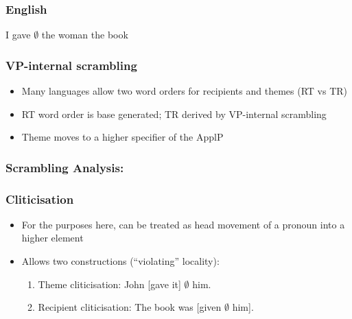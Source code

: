 \documentclass{beamer}
\begin{document}
\begin{frame}
	\frametitle{English}
	\vfill
	I gave $\emptyset$ the woman the book
	\vfill
\end{frame}

\begin{frame}
	\frametitle{VP-internal scrambling}
	\begin{itemize}
		\item Many languages allow two word orders for recipients and themes (RT vs TR)
		\item RT word order is base generated; TR derived by VP-internal scrambling \citep{Takano.1998,Lenerz.1977}
		\item Theme moves to a higher specifier of the ApplP \citep{McGinnis.1998}
	\end{itemize}
\end{frame}

\begin{frame}
	\frametitle{Scrambling Analysis:}
	\begin{exe}
		\ex
{}
	\end{exe}
\end{frame}

\begin{frame}
	\frametitle{Cliticisation}
	\begin{itemize}
		\item For the purposes here, can be treated as head movement of a pronoun into a higher element
		\item Allows two constructions (``violating'' locality):
		\begin{enumerate}
			\item Theme cliticisation: John [gave it] $\emptyset$ him.
			\item Recipient cliticisation: The book was [given $\emptyset$ him].
		\end{enumerate}
	\end{itemize}
\end{frame}
\end{document}
